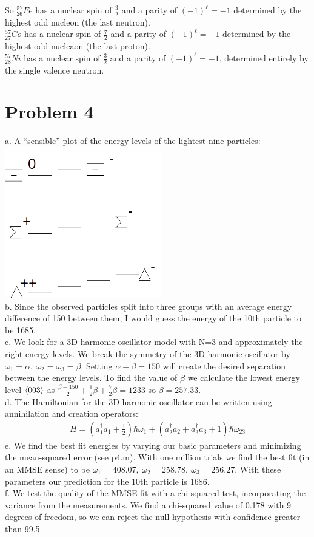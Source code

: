 \documentclass[a4paper,12pt]{article}
\numberwithin{equation}{section}
\begin{document}
So $^{57}_{26}Fe$ has a nuclear spin of $\frac{3}{2}$ and a parity of $(-1)^\ell=-1$ determined by the highest odd nucleon (the last neutron).\\
$^{57}_{27}Co$ has a nuclear spin of $\frac{7}{2}$ and a parity of $(-1)^\ell=-1$ determined by the highest odd nucleaon (the last proton).\\
$^{57}_{28}Ni$  has a nuclear spin of $\frac{3}{2}$ and a parity of $(-1)^\ell=-1$, determined entirely by the single valence neutron.

\section{Problem 4}
a. A ``sensible'' plot of the energy levels of the lightest nine particles: \\
\includegraphics{p4}
\\
b. Since the observed particles split into three groups with an average energy difference of 150 between them, I would guess the energy of the 10th particle to be 1685.\\
c. We look for a 3D harmonic oscillator model with N=3 and approximately the right energy levels. 
We break the symmetry of the 3D harmonic oscillator by $\omega_1=\alpha,\ \omega_2=\omega_3=\beta$.
Setting $\alpha-\beta=150$ will create the desired separation between the energy levels.
To find the value of $\beta$ we calculate the lowest energy level $\braket{0 0 3}$ as $\frac{\beta+150}{2}+ \frac{1}{2}\beta + \frac{7}{2}\beta=1233$ so $\beta=257.33$.\\
d. The Hamiltonian for the 3D harmonic oscillator can be written using annihilation and creation operators:
\begin{gather}
 H=(a_1^\dagger a_1+\frac{1}{2})\hbar \omega_1+(a_2^\dagger a_2+a_3^\dagger a_3 + 1)\hbar \omega_{23}
\end{gather}
e. We find the best fit energies by varying our basic parameters and minimizing the mean-squared error (see p4.m).
With one million trials we find the best fit (in an MMSE sense) to be $\omega_1=408.07,\ \omega_2=258.78,\ \omega_3=256.27$.
With these parameters our prediction for the 10th particle is 1686.\\
f. We test the quality of the MMSE fit with a chi-squared test, incorporating the variance from the measurements.
We find a chi-squared value of 0.178 with 9 degrees of freedom, so we can reject the null hypothesis with confidence greater than 99.5%
\end{document}
